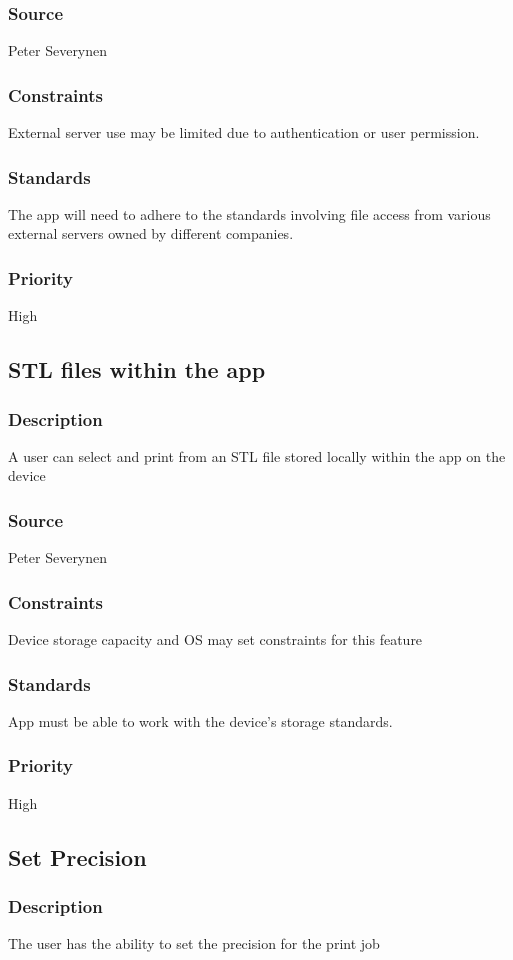 \subsubsection{Source}
Peter Severynen
\subsubsection{Constraints}
External server use may be limited due to authentication or user permission.
\subsubsection{Standards}
The app will need to adhere to the standards involving file access from various external servers owned by different companies.
\subsubsection{Priority}
High
\subsection{STL files within the app}
\subsubsection{Description}
A user can select and print from an STL file stored locally within the app on the device
\subsubsection{Source}
Peter Severynen
\subsubsection{Constraints}
Device storage capacity and OS may set constraints for this feature
\subsubsection{Standards}
App must be able to work with the device's storage standards.
\subsubsection{Priority}
High
\subsection{Set Precision}
\subsubsection{Description}
The user has the ability to set the precision for the print job
